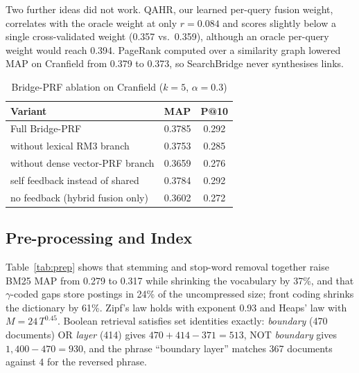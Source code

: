 \documentclass[conference]{IEEEtran}
\begin{document}
Two further ideas did not work. QAHR, our learned per-query fusion weight, correlates with the oracle weight at only $r=0.084$ and scores slightly below a single cross-validated weight (0.357 vs.\ 0.359), although an oracle per-query weight would reach 0.394. PageRank computed over a similarity graph lowered MAP on Cranfield from 0.379 to 0.373, so SearchBridge never synthesises links.

\begin{table}[t]
\caption{Bridge-PRF ablation on Cranfield ($k=5$, $\alpha=0.3$)}
\label{tab:abl}
\centering\footnotesize
\begin{tabular}{@{}lcc@{}}
\toprule
Variant & MAP & P@10 \\
\midrule
Full Bridge-PRF & 0.3785 & 0.292 \\
\quad without lexical RM3 branch & 0.3753 & 0.285 \\
\quad without dense vector-PRF branch & 0.3659 & 0.276 \\
\quad self feedback instead of shared & 0.3784 & 0.292 \\
\quad no feedback (hybrid fusion only) & 0.3602 & 0.272 \\
\bottomrule
\end{tabular}
\end{table}

\subsection{Pre-processing and Index}
Table~\ref{tab:prep} shows that stemming and stop-word removal together raise BM25 MAP from 0.279 to 0.317 while shrinking the vocabulary by 37\%, and that $\gamma$-coded gaps store postings in 24\% of the uncompressed size; front coding shrinks the dictionary by 61\%. Zipf's law holds with exponent 0.93 and Heaps' law with $M=24\,T^{0.45}$. Boolean retrieval satisfies set identities exactly: \textit{boundary} (470 documents) OR \textit{layer} (414) gives $470+414-371=513$, NOT \textit{boundary} gives $1{,}400-470=930$, and the phrase ``boundary layer'' matches 367 documents against 4 for the reversed phrase.
\end{document}
